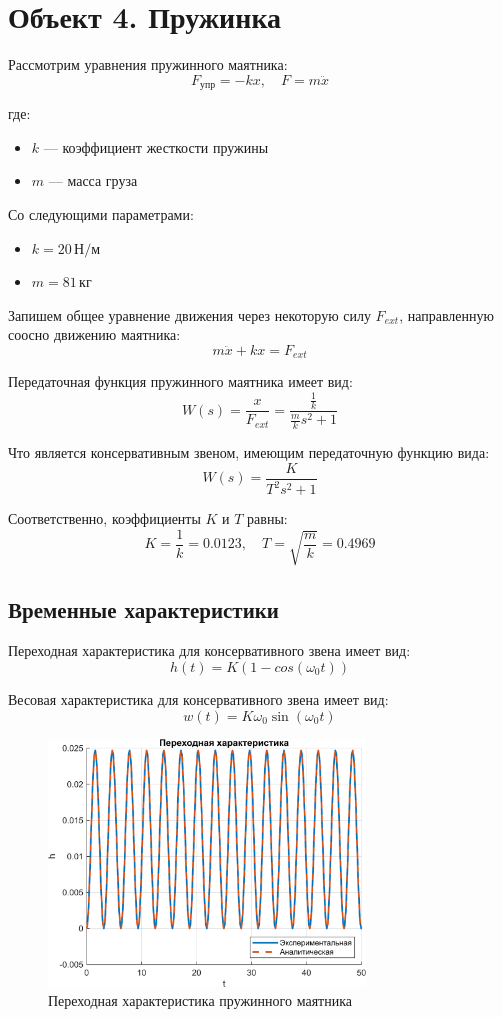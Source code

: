 \chapter{Объект 4. Пружинка}
Рассмотрим уравнения пружинного маятника:
\[
    F_{\text{упр}} = -k x, \quad F = m \ddot{x}
\]

где:
\begin{itemize}
    \item[] \( k \) — коэффициент жесткости пружины
    \item[] \( m \) — масса груза
\end{itemize}

Со следующими параметрами:
\begin{itemize}
    \item[] \( k = 20\, \text{Н} / \text{м} \)
    \item[] \( m = 81\, \text{кг} \)
\end{itemize}

Запишем общее уравнение движения через некоторую силу \( F_{ext} \), 
направленную соосно движению маятника:
\[
    m \ddot{x} + k x = F_{ext}
\]

Передаточная функция пружинного маятника имеет вид:
\[
    W(s) = \frac{x}{F_{ext}} = \frac{\frac{1}{k}}{\frac{m}{k}s^2 + 1}
\]

Что является консервативным звеном, имеющим передаточную функцию вида:
\[
    W(s) = \frac{K}{T^2 s^2 + 1}
\]

Соответственно, коэффициенты \( K \) и \( T \) равны:
\[
    K = \frac{1}{k} = 0.0123, \quad T = \sqrt{\frac{m}{k}} = 0.4969
\]

\section{Временные характеристики}

Переходная характеристика для консервативного звена имеет вид:
\[
    h(t) = K \left( 1 - cos(\omega_0 t) \right)
\]

Весовая характеристика для консервативного звена имеет вид:
\[
    w(t) = K \omega_0 \sin(\omega_0 t)
\]

\begin{figure}[H]
    \centering
    \includegraphics[width=0.75\textwidth, trim={0cm 0cm 0cm 0cm}]{../images/4_1.png}
    \caption{Переходная характеристика пружинного маятника}
\end{figure}

